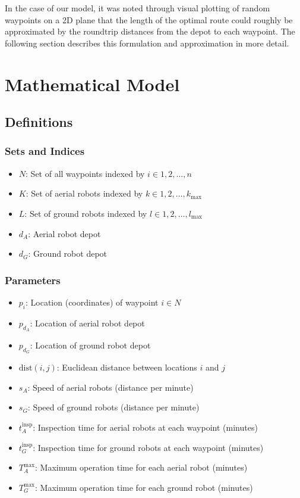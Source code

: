\documentclass{article}
\begin{document}
		In the case of our model, it was noted through visual plotting of random waypoints on a 2D plane that the length of the optimal route could roughly be approximated by the roundtrip distances from the depot to each waypoint. 
		The following section describes this formulation and approximation in more detail.

	\section{Mathematical Model}\label{math_model}

		\subsection{Definitions}


			\subsubsection{Sets and Indices}

				\begin{itemize}
				\item $N$: Set of all waypoints indexed by $i \in {1, 2, \ldots, n}$
				\item $K$: Set of aerial robots indexed by $k \in {1, 2, \ldots, k_{\max}}$
				\item $L$: Set of ground robots indexed by $l \in {1, 2, \ldots, l_{\max}}$
				\item $d_A$: Aerial robot depot
				\item $d_G$: Ground robot depot
				\end{itemize}

			\subsubsection{Parameters}

				\begin{itemize}
				\item $p_i$: Location (coordinates) of waypoint $i \in N$
				\item $p_{d_A}$: Location of aerial robot depot
				\item $p_{d_G}$: Location of ground robot depot
				\item $\text{dist}(i,j)$: Euclidean distance between locations $i$ and $j$
				\item $s_A$: Speed of aerial robots (distance per minute)
				\item $s_G$: Speed of ground robots (distance per minute)
				\item $t_A^{\text{insp}}$: Inspection time for aerial robots at each waypoint (minutes)
				\item $t_G^{\text{insp}}$: Inspection time for ground robots at each waypoint (minutes)
				\item $T_A^{\max}$: Maximum operation time for each aerial robot (minutes)
				\item $T_G^{\max}$: Maximum operation time for each ground robot (minutes)
				\end{itemize}
\end{document}
